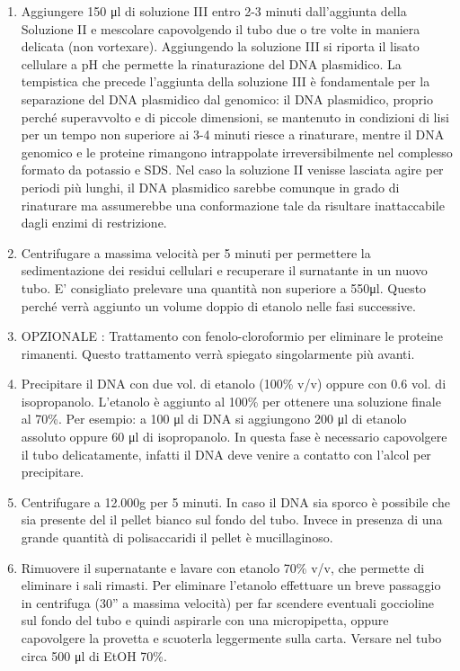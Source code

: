 \begin{enumerate}
  \item Aggiungere 150 μl di soluzione III entro 2-3 minuti dall’aggiunta della Soluzione II e
	mescolare capovolgendo il tubo due o tre volte in maniera delicata (non vortexare).
	Aggiungendo la soluzione III si riporta il lisato cellulare a pH che permette la rinaturazione del DNA plasmidico.
	La tempistica che precede l’aggiunta della soluzione III è fondamentale per la separazione del DNA plasmidico dal genomico:
	il DNA plasmidico, proprio perché superavvolto e di piccole dimensioni, se mantenuto in condizioni di lisi per un tempo non
	superiore ai 3-4 minuti riesce a rinaturare, mentre il DNA genomico e le proteine rimangono intrappolate irreversibilmente nel
	complesso formato da potassio e SDS. Nel caso la soluzione II venisse lasciata agire per periodi più lunghi,
	il DNA plasmidico sarebbe comunque in grado di rinaturare ma assumerebbe una conformazione tale da risultare inattaccabile
	dagli enzimi di restrizione.

  \item Centrifugare a massima velocità per 5 minuti per permettere la sedimentazione dei residui cellulari e recuperare
	il surnatante in un nuovo tubo. E’ consigliato prelevare una quantità non superiore a 550μl.
	Questo perché verrà aggiunto un volume doppio di etanolo nelle fasi successive.

  \item OPZIONALE : Trattamento con fenolo-cloroformio per eliminare le proteine rimanenti. Questo trattamento verrà
	spiegato singolarmente più avanti.

  \item Precipitare il DNA con due vol. di etanolo (100\% v/v) oppure con 0.6 vol. di isopropanolo. L'etanolo è aggiunto
	al 100\% per ottenere una soluzione finale al 70\%. Per esempio: a 100 μl di DNA si aggiungono 200 μl di etanolo
	assoluto oppure 60 μl di isopropanolo. In questa fase è necessario capovolgere il tubo delicatamente, infatti il DNA
	deve venire a contatto con l’alcol per precipitare.

  \item Centrifugare a 12.000g per 5 minuti. In caso il DNA sia sporco è possibile che sia presente del il pellet bianco sul fondo del tubo.
	Invece in presenza di una grande quantità di polisaccaridi il pellet è mucillaginoso.

  \item Rimuovere il supernatante e lavare con etanolo 70\% v/v, che permette di eliminare i sali rimasti.
	Per eliminare l’etanolo effettuare un breve passaggio in centrifuga (30” a massima velocità) per far scendere eventuali
	goccioline sul fondo del tubo e quindi aspirarle con una micropipetta, oppure capovolgere la provetta e scuoterla
	leggermente sulla carta. Versare nel tubo circa 500 μl di EtOH 70\%.


\end{enumerate}

